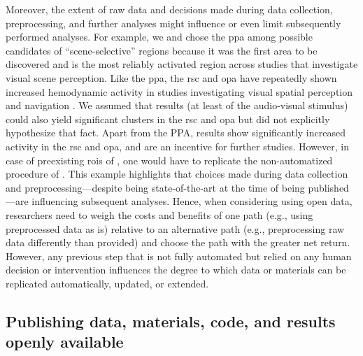 %
Moreover, the extent of raw data and decisions made during data collection,
preprocessing, and further analyses might influence or even limit subsequently
performed analyses.
%
For example, we and \citet{sengupta2016extension} chose the \ac{ppa} among
possible candidates of ``scene-selective'' regions because it was the first area
to be discovered and is the most reliably activated region across studies that
investigate visual scene perception.
%
Like the \ac{ppa}, the \ac{rsc} and \ac{opa} have repeatedly shown increased
hemodynamic activity in studies investigating visual spatial perception and
navigation \citep{chrastil2018heterogeneity, bettencourt2013role,
dilks2013occipital, epstein2019scene}.
%
We assumed that results (at least of the audio-visual stimulus) could also yield
significant clusters in the \ac{rsc} and \ac{opa} but did not explicitly
hypothesize that fact.
%
Apart from the PPA, results show significantly increased activity in the
\ac{rsc} and \ac{opa}, and are an incentive for further studies.
However, in case of preexisting \acp{roi} of \citep{sengupta2016extension}, one
would have to replicate the non-automatized procedure of
\citep{sengupta2016extension}.
%
This example highlights that choices made during data collection and
preprocessing---despite being state-of-the-art at the time of being
published---are influencing subsequent analyses.
Hence, when considering using open data, researchers need to weigh the costs and
benefits of one path (e.g., using preprocessed data as is) relative to an
alternative path (e.g., preprocessing raw data differently than provided) and
choose the path with the greater net return.
%
However, any previous step that is not fully automated but relied on any human
decision or intervention influences the degree to which data or materials can be
replicated automatically, updated, or extended.


\subsection{Publishing data, materials, code, and results openly available}


%

